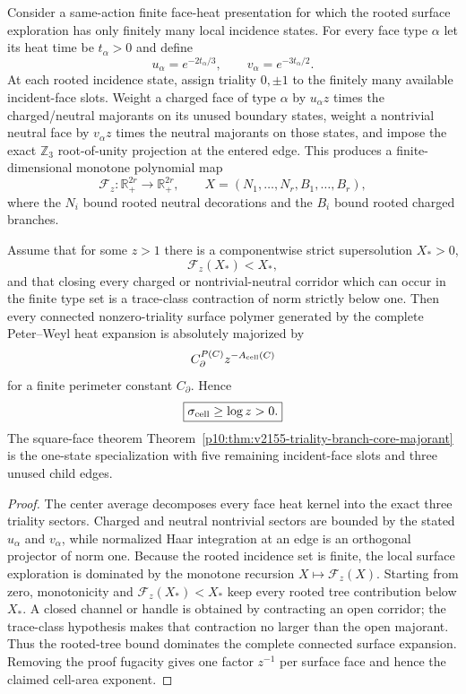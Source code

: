 \documentclass[12pt,a4paper]{article}
\begin{document}
\begin{theorem}
\label{p10:thm:v2158-finite-type-triality-branch-core}
Consider a same-action finite face-heat presentation for which the rooted
surface exploration has only finitely many local incidence states.  For every
face type $\alpha$ let its heat time be $t_\alpha>0$ and define
\[
 u_\alpha=e^{-2t_\alpha/3},\qquad
 v_\alpha=e^{-3t_\alpha/2}.
\]
At each rooted incidence state, assign triality $0,\pm1$ to the finitely many
available incident-face slots.  Weight a charged face of type $\alpha$ by
$u_\alpha z$ times the charged/neutral majorants on its unused boundary
states, weight a nontrivial neutral face by $v_\alpha z$ times the neutral
majorants on those states, and impose the exact $\mathbb Z_3$ root-of-unity
projection at the entered edge.  This produces a finite-dimensional monotone
polynomial map
\[
 \mathcal F_z:\mathbb R_+^{2r}\longrightarrow\mathbb R_+^{2r},
 \qquad X=(N_1,\ldots,N_r,B_1,\ldots,B_r),
\]
where the $N_i$ bound rooted neutral decorations and the $B_i$ bound rooted
charged branches.

Assume that for some $z>1$ there is a componentwise strict supersolution
$X_*>0$,
\[
 \boxed{\mathcal F_z(X_*)<X_*},
\]
and that closing every charged or nontrivial-neutral corridor which can occur
in the finite type set is a trace-class contraction of norm strictly below
one.  Then every connected nonzero-triality surface polymer generated by the
complete Peter--Weyl heat expansion is absolutely majorized by
\[
 C_\partial^{P(C)}z^{-A_{\rm cell}(C)}
\]
for a finite perimeter constant $C_\partial$.  Hence
\[
 \boxed{\sigma_{\rm cell}\ge\log z>0.}
\]
The square-face theorem
Theorem~\ref{p10:thm:v2155-triality-branch-core-majorant} is the one-state
specialization with five remaining incident-face slots and three unused child
edges.
\end{theorem}
\begin{proof}
The center average decomposes every face heat kernel into the exact three
triality sectors.  Charged and neutral nontrivial sectors are bounded by the
stated $u_\alpha$ and $v_\alpha$, while normalized Haar integration at an edge
is an orthogonal projector of norm one.  Because the rooted incidence set is
finite, the local surface exploration is dominated by the monotone recursion
$X\mapsto\mathcal F_z(X)$.  Starting from zero, monotonicity and
$\mathcal F_z(X_*)<X_*$ keep every rooted tree contribution below $X_*$.  A
closed channel or handle is obtained by contracting an open corridor; the
trace-class hypothesis makes that contraction no larger than the open
majorant.  Thus the rooted-tree bound dominates the complete connected
surface expansion.  Removing the proof fugacity gives one factor $z^{-1}$ per
surface face and hence the claimed cell-area exponent.
\end{proof}
\end{document}
